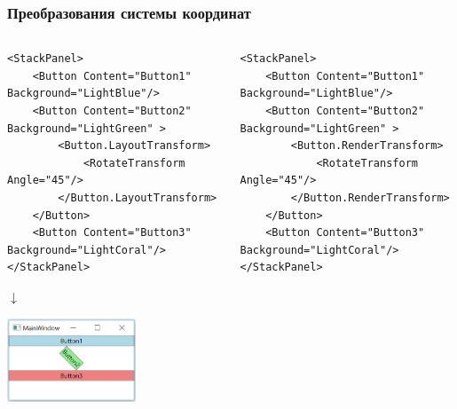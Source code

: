 \documentclass[xetex,mathserif,serif]{beamer}
\newcommand{\DownArrow} {
	\hspace{2cm}\begin{LARGE}$\downarrow$\end{LARGE}
}
\begin{document}
	\begin{frame}[fragile]
		\frametitle{Преобразования системы координат}
		\begin{columns}
			\begin{column}{0.5\textwidth}
				\begin{tiny}
					\begin{verbatim}
<StackPanel>
    <Button Content="Button1" Background="LightBlue"/>
    <Button Content="Button2" Background="LightGreen" >
        <Button.LayoutTransform>
            <RotateTransform Angle="45"/>
        </Button.LayoutTransform>
    </Button>
    <Button Content="Button3" Background="LightCoral"/>
</StackPanel>
					\end{verbatim}
				\end{tiny}

				\DownArrow
				\begin{center}
					\includegraphics[width=0.6\textwidth]{layoutTransform.png}
				\end{center}
			\end{column}
			\begin{column}{0.5\textwidth}
				\begin{tiny}
					\begin{verbatim}
<StackPanel>
    <Button Content="Button1" Background="LightBlue"/>
    <Button Content="Button2" Background="LightGreen" >
        <Button.RenderTransform>
            <RotateTransform Angle="45"/>
        </Button.RenderTransform>
    </Button>
    <Button Content="Button3" Background="LightCoral"/>
</StackPanel>
					\end{verbatim}
				\end{tiny}


\end{column}
\end{columns}
\end{frame}
\end{document}
